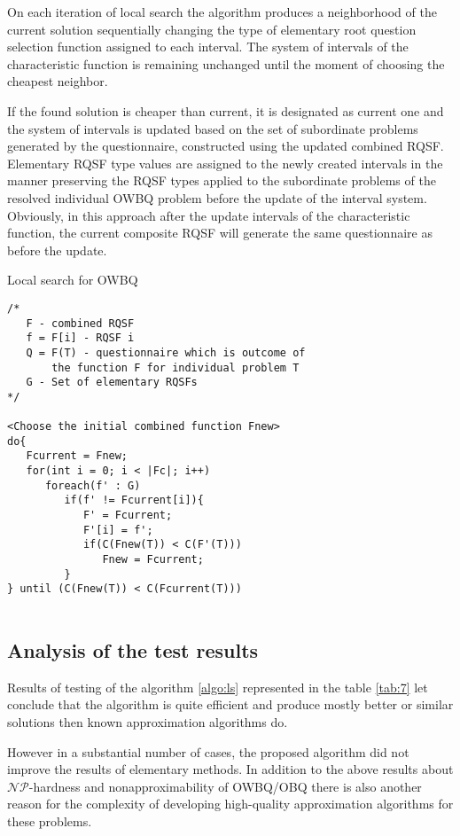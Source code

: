 \documentclass[11pt]{article}
\begin{document}
On each iteration of local search the algorithm produces a neighborhood of the current solution sequentially changing the type of elementary root question selection function assigned to each interval. The system of intervals of the characteristic function is remaining unchanged until the moment of choosing the cheapest neighbor.

If the found solution is cheaper than current, it is designated as current one and the system of intervals is updated based on the set of subordinate problems generated by the questionnaire, constructed using the updated combined RQSF. Elementary RQSF type values are assigned to the newly created intervals in the manner preserving the RQSF types applied to the subordinate problems of the resolved individual OWBQ problem before the update of the interval system. Obviously, in this approach after the update intervals of the characteristic function, the current composite RQSF will generate the same questionnaire as before the update.

\begin{algo}
\large
\caption{{\large Local search for OWBQ}\label{algo:ls}}
\begin{verbatim}
/*
   F - combined RQSF 
   f = F[i] - RQSF i 
   Q = F(T) - questionnaire which is outcome of 
       the function F for individual problem T 
   G - Set of elementary RQSFs
*/

<Choose the initial combined function Fnew>
do{
   Fcurrent = Fnew;
   for(int i = 0; i < |Fc|; i++)
      foreach(f' : G)
         if(f' != Fcurrent[i]){
            F' = Fcurrent;
            F'[i] = f';
            if(C(Fnew(T)) < C(F'(T)))
               Fnew = Fcurrent;
         }
} until (C(Fnew(T)) < C(Fcurrent(T)))
     
\end{verbatim}
\normalsize
\end{algo}

%
%
%
\subsection{Analysis of the test results}\label{sec:res}
Results of testing of the algorithm \ref{algo:ls} represented in the table \ref{tab:7} let conclude that the algorithm is quite efficient and produce mostly better or similar solutions then known approximation algorithms do.

However in a substantial number of cases, the proposed algorithm did not improve the results of elementary methods. In addition to the above results about $\mathcal{NP}$-hardness and nonapproximability of OWBQ/OBQ there is also another reason for the complexity of developing high-quality approximation algorithms for these problems.
\end{document}
